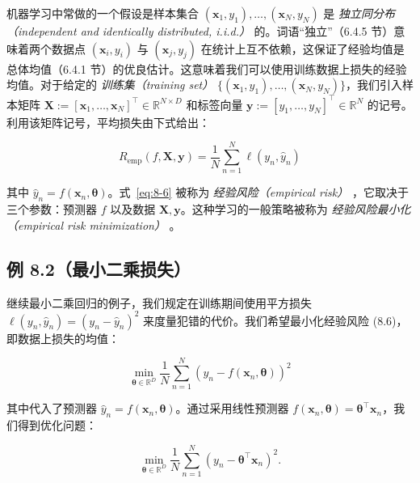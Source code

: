 机器学习中常做的一个假设是样本集合 $ (\boldsymbol{x}_1, y_1), \ldots, (\boldsymbol{x}_N, y_N) $ 是 \emph{独立同分布（independent and identically distributed, i.i.d.）} 的。词语“独立”（6.4.5 节）意味着两个数据点 $ (\boldsymbol{x}_i, y_i) $ 与 $ (\boldsymbol{x}_j, y_j) $ 在统计上互不依赖，这保证了经验均值是总体均值（6.4.1 节）的优良估计。这意味着我们可以使用训练数据上损失的经验均值。对于给定的 \emph{训练集（training set）} $ \{(\boldsymbol{x}_1, y_1), \ldots, (\boldsymbol{x}_N, y_N)\} $，我们引入样本矩阵 $ \boldsymbol{X} := [\boldsymbol{x}_1, \ldots, \boldsymbol{x}_N]^\top \in \mathbb{R}^{N \times D} $ 和标签向量 $ \boldsymbol{y} := [y_1, \ldots, y_N]^\top \in \mathbb{R}^N $ 的记号。利用该矩阵记号，平均损失由下式给出：

\begin{equation}
R_{\text{emp}}(f, \boldsymbol{X}, \boldsymbol{y}) = \frac{1}{N} \sum_{n=1}^N \ell(y_n, \hat{y}_n)
\tag{8.6}\label{eq:8-6}
\end{equation}

其中 $ \hat{y}_n = f(\boldsymbol{x}_n, \boldsymbol{\theta}) $。式~\eqref{eq:8-6} 被称为 \emph{经验风险（empirical risk）} ，它取决于三个参数：预测器 $ f $ 以及数据 $ \boldsymbol{X}, \boldsymbol{y} $。这种学习的一般策略被称为 \emph{经验风险最小化（empirical risk minimization）} 。

\subsection*{例 8.2（最小二乘损失）}

继续最小二乘回归的例子，我们规定在训练期间使用平方损失 $ \ell(y_n, \hat{y}_n) = (y_n - \hat{y}_n)^2 $ 来度量犯错的代价。我们希望最小化经验风险 (8.6)，即数据上损失的均值：

\begin{equation}
\min_{\boldsymbol{\theta} \in \mathbb{R}^D} \frac{1}{N} \sum_{n=1}^N \left(y_n - f(\boldsymbol{x}_n, \boldsymbol{\theta})\right)^2
\tag{8.7}\label{eq:8-7}
\end{equation}

其中代入了预测器 $ \hat{y}_n = f(\boldsymbol{x}_n, \boldsymbol{\theta}) $。通过采用线性预测器 $ f(\boldsymbol{x}_n, \boldsymbol{\theta}) = \boldsymbol{\theta}^\top \boldsymbol{x}_n $，我们得到优化问题：

\begin{equation}
\min_{\boldsymbol{\theta} \in \mathbb{R}^D} \frac{1}{N} \sum_{n=1}^N \left(y_n - \boldsymbol{\theta}^\top \boldsymbol{x}_n\right)^2 .
\tag{8.8}\label{eq:8-8}
\end{equation}

